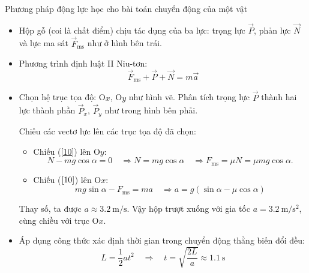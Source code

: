 \begin{dang}{Phương pháp động lực học cho bài toán chuyển động của một vật}
{	\begin{itemize}
		\item Hộp gỗ (coi là chất điểm) chịu tác dụng của ba lực: trọng lực $\vec P$, phản lực $\vec N$ và lực ma sát $\vec F_\text{ms}$ như ở hình bên trái.
		
		\item Phương trình định luật II Niu-tơn:
		\begin{equation}\label{10}
			\vec F_\text{ms} + \vec P + \vec N = m \vec a
		\end{equation}
		
		\item Chọn hệ trục tọa độ: O$x$, O$y$ như hình vẽ. Phân tích trọng lực $\vec P$ thành hai lực thành phần $\vec P_x$, $\vec P_y$ như trong hình bên phải.
		
		Chiếu các vectơ lực lên các trục tọa độ đã chọn:
		\begin{itemize}
			\item Chiếu (\ref{10}) lên O$y$:
			\begin{equation}\label{12}
				N - mg \cos \alpha = 0 \quad\Rightarrow N = mg\cos\alpha \quad\Rightarrow F_\text{ms}=\mu N=\mu mg \cos\alpha.
			\end{equation}
			\item Chiếu ($\ref{10}$) lên O$x$:
			\begin{equation}\label{11}
				mg \sin \alpha - F_\text{ms} = ma \quad\Rightarrow a= g(\sin \alpha - \mu \cos \alpha)
			\end{equation}
		\end{itemize}
		
		Thay số, ta được $a \approx \SI{3.2}{\meter/\second}$. Vậy hộp trượt xuống với gia tốc $a=\SI{3.2}{\meter/\second^2}$, cùng chiều với trục O$x$.
		
		\item Áp dụng công thức xác định thời gian trong chuyển động thẳng biến đổi đều:
		$$L=\dfrac{1}{2}at^2\quad\Rightarrow\quad t=\sqrt{\dfrac{2L}{a}} \approx \SI{1.1}{\second}$$
	\end{itemize}
}
\end{dang}
